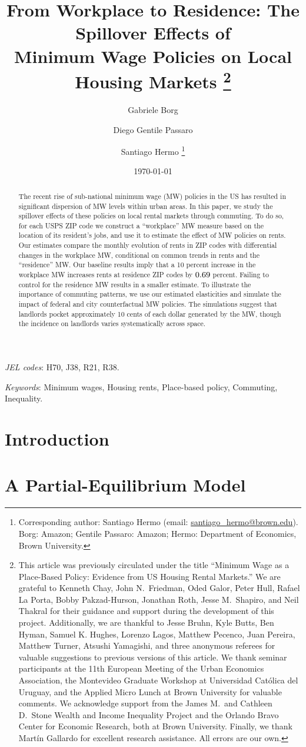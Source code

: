 \documentclass{article}
\title{ From Workplace to Residence: The Spillover Effects of \\
        Minimum Wage Policies on Local Housing Markets%
        \thanks{This article was previously circulated under the title
        ``Minimum Wage as a Place-Based Policy: Evidence from US Housing Rental 
        Markets.''
        We are grateful to Kenneth Chay, John N.\ Friedman, Oded Galor, 
        Peter Hull, Rafael La Porta, Bobby Pakzad-Hurson, Jonathan Roth, 
        Jesse M.\ Shapiro, and Neil Thakral 
        for their guidance and support during the development of this project.
        Additionally, we are thankful to Jesse Bruhn, Kyle Butts, 
        Ben Hyman, Samuel K. Hughes, Lorenzo Lagos, Matthew Pecenco, 
        Juan Pereira, Matthew Turner, Atsushi Yamagishi, and three anonymous 
        referees for valuable suggestions to previous versions of this article.
        We thank seminar participants at 
        the 11th European Meeting of the Urban Economics Association, 
        the Montevideo Graduate Workshop at Universidad Católica del Uruguay, and
        the Applied Micro Lunch at Brown University for valuable comments.
        We acknowledge support from 
        the James M.\ and Cathleen D.\ Stone Wealth and Income Inequality Project and 
        the Orlando Bravo Center for Economic Research, both at Brown University.
        Finally, we thank Martín Gallardo for excellent research assistance.
        All errors are our own.}}
\author{Gabriele Borg \and Diego Gentile Passaro \and Santiago Hermo%
        \footnote{Corresponding author: Santiago Hermo (email: \url{santiago_hermo@brown.edu}).
        Borg: Amazon;
        Gentile Passaro: Amazon;
        Hermo: Department of Economics, Brown University.}}
\date{\today}
\begin{document}

\maketitle

\begin{abstract}
    \noindent
    The recent rise of sub-national minimum wage (MW) policies in the US has 
    resulted in significant dispersion of MW levels within urban areas.
    In this paper, we study the spillover effects of these policies on local
    rental markets through commuting.
    To do so, for each USPS ZIP code we construct a ``workplace'' MW measure 
    based on the location of its resident's jobs, and use it to estimate the 
    effect of MW policies on rents.
    Our estimates compare the monthly evolution of rents in ZIP codes with 
    differential changes in the workplace MW, conditional on common trends 
    in rents and the ``residence'' MW.
    Our baseline results imply that a 10 percent increase in the workplace MW 
    increases rents at residence ZIP codes by $0.69$ percent.
    Failing to control for the residence MW results in a smaller estimate.
    To illustrate the importance of commuting patterns, we use our estimated 
    elasticities and simulate the impact of federal and city counterfactual 
    MW policies.
    The simulations suggest that landlords pocket approximately 10 cents of each 
    dollar generated by the MW, though the incidence on landlords varies 
    systematically across space.
\end{abstract}

\noindent \textit{JEL codes}: H70, J38, R21, R38.

\noindent \textit{Keywords}: Minimum wages, Housing rents, Place-based policy, Commuting, Inequality.


\clearpage


\section{Introduction}\label{sec:intro}
    

\section{A Partial-Equilibrium Model}\label{sec:model}
    
\end{document}
